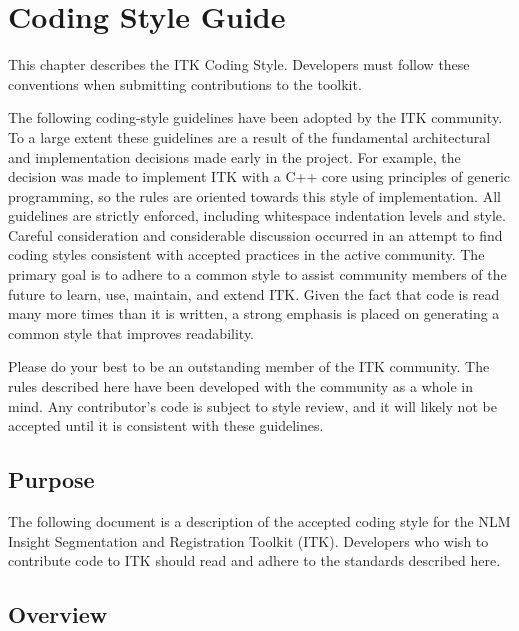 \chapter{Coding Style Guide}%
\label{ch:CodingStyleGuide}

This chapter describes the ITK Coding Style. Developers must follow these
conventions when submitting contributions to the toolkit.

The following coding-style guidelines have been adopted by the ITK community.
To a large extent these guidelines are a result of the fundamental
architectural and implementation decisions made early in the project. For
example, the decision was made to implement ITK with a C++ core using
principles of generic programming, so the rules are oriented towards this style
of implementation. All guidelines are strictly enforced, including whitespace
indentation levels and style. Careful consideration and considerable discussion
occurred in an attempt to find coding
styles consistent with accepted practices in the active community.
The primary goal is to adhere to a common
style to assist community members of the future to learn, use, maintain, and
extend ITK. Given the fact that code is read many more times than it is written, a strong
emphasis is placed on generating a common style that improves readability.

Please do your best to be an outstanding member of the ITK community. The rules
described here have been developed with the community as a whole in mind.
Any contributor's code is subject to style review, and it will likely not be
accepted until it is consistent with these guidelines.


\section{Purpose}%
\label{sec:Purpose}

The following document is a description of the accepted coding style for the
NLM Insight Segmentation and Registration Toolkit (ITK). Developers who wish
to contribute code to ITK should read and adhere to the standards described
here.


\section{Overview}%
\label{sec:Overview}

